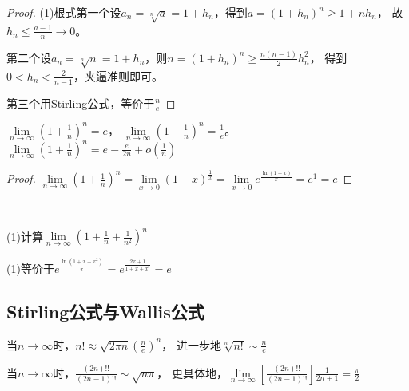\begin{proof}
  (1)根式第一个设$a_n = \sqrt[n]{a} = 1+h_n$，得到$a = (1 + h_n)^n \geq 1 + nh_n$，
  故$h_n \leq \frac{a - 1}{n} \rightarrow 0$。
  
  第二个设$a_n = \sqrt[n]{n} = 1 + h_n$，则$n = (1 + h_n)^n \geq \frac{n(n-1)}{2}h_n^2$，
  得到$0 < h_n < \frac{2}{n-1}$，夹逼准则即可。

  第三个用Stirling公式，等价于$\frac{n}{e}$
\end{proof}

\begin{theorem}[重要极限]
  $\lim \limits _{n \rightarrow \infty} (1 + \frac{1}{n})^n = e$，
  $\lim \limits _{n \rightarrow \infty} (1 - \frac{1}{n})^n = \frac{1}{e}$。
  $\lim \limits _{n \rightarrow \infty} (1 + \frac{1}{n})^n = e - \frac{e}{2n} + o(\frac{1}{n})$
\end{theorem}

\begin{proof}
  $\lim \limits _{n \rightarrow \infty} \left( 1 + \frac{1}{n} \right)^n = \lim \limits _{x \rightarrow 0} (1 + x)^{\frac{1}{x}} = \lim \limits _{x \rightarrow 0} e^{\frac{\ln (1 + x)}{x}} = e^1 = e$
\end{proof}

~

\begin{exercise}[相关练习]
  (1)计算$\lim \limits _{n \rightarrow \infty} \left( 1 + \frac{1}{n} + \frac{1}{n^2} \right)^n$
\end{exercise}

\begin{solution}
  (1)等价于$e^{\frac{\ln(1 + x + x^2)}{x}} = e^{\frac{2x + 1}{1 + x + x^{^2}}} = e$
\end{solution}

\subsection{Stirling公式与Wallis公式}

\begin{theorem}[Stirling公式]
  当$n \rightarrow \infty$时，$n! \approx \sqrt{2\pi n}(\frac{n}{e})^n$，
  进一步地$\sqrt[n]{n!} \sim \frac{n}{e}$
\end{theorem}

\begin{theorem}[Wallis公式]
  当$n \rightarrow \infty$时，$\frac{(2n)!!}{(2n-1)!!} \sim \sqrt{n\pi}$，
  更具体地，$\lim \limits _{n \rightarrow \infty} \left[ \frac{(2n)!!}{(2n-1)!!} \right] \frac{1}{2n+1} = \frac{\pi}{2}$
\end{theorem}

